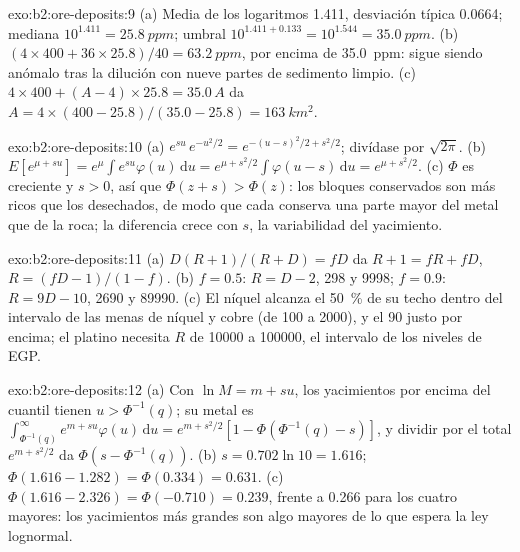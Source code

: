 \begin{solution}{exo:b2:ore-deposits:9}
(a) Media de los logaritmos 1.411, desviación típica 0.0664; mediana $10^{1.411} = \qty{25.8}{ppm}$;
umbral $10^{1.411 + 0.133} = 10^{1.544} = \qty{35.0}{ppm}$. (b) $(4 \times 400 + 36 \times 25.8)/40 =
\qty{63.2}{ppm}$, por encima de \qty{35.0}{ppm}: sigue siendo anómalo tras la dilución con nueve partes de sedimento
limpio. (c) $4 \times 400 + (A - 4) \times 25.8 = 35.0\,A$ da $A = 4 \times (400 -
25.8)/(35.0 - 25.8) = \qty{163}{km^2}$.
\end{solution}

\begin{solution}{exo:b2:ore-deposits:10}
(a) $e^{su}\,e^{-u^2/2} = e^{-(u - s)^2/2 + s^2/2}$; divídase por $\sqrt{2\pi}$. (b) $E[e^{\mu + su}] =
e^{\mu}\int e^{su}\varphi(u)\,\mathrm{d}u = e^{\mu + s^2/2}\int\varphi(u - s)\,\mathrm{d}u = e^{\mu +
s^2/2}$. (c) $\Phi$ es creciente y $s > 0$, así que $\Phi(z + s) > \Phi(z)$: los bloques conservados son más ricos que
los desechados, de modo que cada  conserva una parte mayor del metal que de la roca; la
diferencia crece con $s$, la variabilidad del yacimiento.
\end{solution}

\begin{solution}{exo:b2:ore-deposits:11}
(a) $D(R + 1)/(R + D) = fD$ da $R + 1 = fR + fD$, $R = (fD - 1)/(1 - f)$. (b) $f = 0.5$: $R = D - 2$,
298 y \num{9998}; $f = 0.9$: $R = 9D - 10$, \num{2690} y \num{89990}. (c) El níquel alcanza el
\qty{50}{\percent} de su techo dentro del intervalo de las menas de níquel y cobre (de 100 a \num{2000}), y el 90 justo por encima;
el platino necesita $R$ de \num{10000} a \num{100000}, el intervalo de los niveles de EGP.
\end{solution}

\begin{solution}{exo:b2:ore-deposits:12}
(a) Con $\ln M = m + s u$, los yacimientos por encima del cuantil tienen $u > \Phi^{-1}(q)$; su metal es
$\int_{\Phi^{-1}(q)}^{\infty} e^{m + su}\varphi(u)\,\mathrm{d}u = e^{m + s^2/2}[1 - \Phi(\Phi^{-1}(q) -
s)]$, y dividir por el total $e^{m + s^2/2}$ da $\Phi(s - \Phi^{-1}(q))$. (b) $s = 0.702 \ln 10 =
1.616$; $\Phi(1.616 - 1.282) = \Phi(0.334) = 0.631$. (c) $\Phi(1.616 - 2.326) = \Phi(-0.710) = 0.239$,
frente a 0.266 para los cuatro mayores: los yacimientos más grandes son algo mayores de lo que espera la ley
lognormal.
\end{solution}

